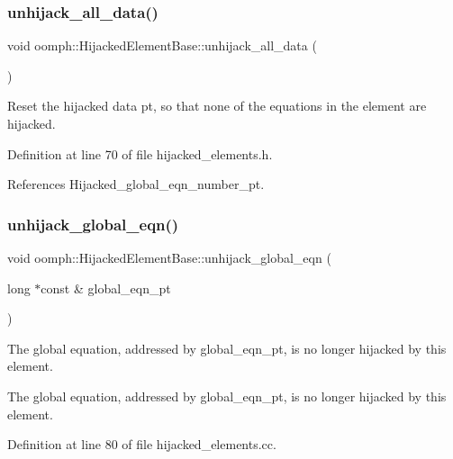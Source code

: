 \subsubsection{\texorpdfstring{unhijack\+\_\+all\+\_\+data()}{unhijack\_all\_data()}}
{\footnotesize\ttfamily void oomph\+::\+Hijacked\+Element\+Base\+::unhijack\+\_\+all\+\_\+data (\begin{DoxyParamCaption}{ }\end{DoxyParamCaption})\hspace{0.3cm}{\ttfamily [inline]}}



Reset the hijacked data pt, so that none of the equations in the element are hijacked. 



Definition at line 70 of file hijacked\+\_\+elements.\+h.



References Hijacked\+\_\+global\+\_\+eqn\+\_\+number\+\_\+pt.

\mbox{\label{classoomph_1_1HijackedElementBase_aa94e2c93374151302879645f4c354c3f}} 
\subsubsection{\texorpdfstring{unhijack\+\_\+global\+\_\+eqn()}{unhijack\_global\_eqn()}}
{\footnotesize\ttfamily void oomph\+::\+Hijacked\+Element\+Base\+::unhijack\+\_\+global\+\_\+eqn (\begin{DoxyParamCaption}\item[{long $\ast$const \&}]{global\+\_\+eqn\+\_\+pt }\end{DoxyParamCaption})\hspace{0.3cm}{\ttfamily [protected]}}



The global equation, addressed by global\+\_\+eqn\+\_\+pt, is no longer hijacked by this element. 

The global equation, addressed by global\+\_\+eqn\+\_\+pt, is no longer hijacked by this element. 

Definition at line 80 of file hijacked\+\_\+elements.\+cc.



